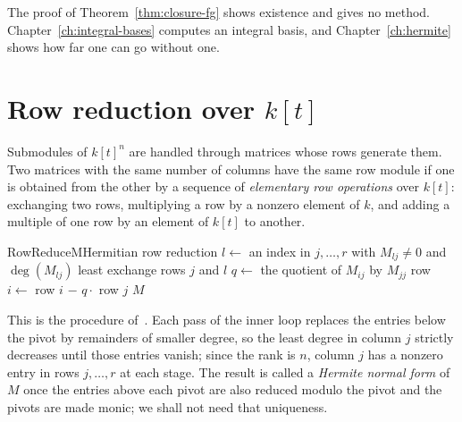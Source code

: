 The proof of Theorem~\ref{thm:closure-fg} shows existence and gives no
method. Chapter~\ref{ch:integral-bases} computes an integral basis, and
Chapter~\ref{ch:hermite} shows how far one can go without one.

\section{Row reduction over \texorpdfstring{$k[t]$}{k[t]}}\label{sec:prelim-hermite}

Submodules of $k[t]^n$ are handled through matrices whose rows generate
them. Two matrices with the same number of columns have the same row module
if one is obtained from the other by a sequence of \emph{elementary row
operations} over $k[t]$: exchanging two rows, multiplying a row by a nonzero
element of $k$, and adding a multiple of one row by an element of $k[t]$ to
another.

\begin{algo}{RowReduce}{M}{Hermitian row reduction}
  \Repeat
    \State $l \gets$ an index in $j, \dots, r$ with $M_{lj} \ne 0$ and $\deg(M_{lj})$ least
    \State exchange rows $j$ and $l$
      \State $q \gets$ the quotient of $M_{ij}$ by $M_{jj}$
      \State row $i \gets$ row $i$ $-$ $q \cdot$ row $j$
    \EndFor
\EndFor
\State \Return $M$
\end{algo}

This is the procedure of~\cite[\S2.1.1]{trager1984}. Each pass of the inner
loop replaces the entries below the pivot by remainders of smaller degree, so
the least degree in column $j$ strictly decreases until those entries vanish;
since the rank is $n$, column $j$ has a nonzero entry in rows $j, \dots, r$
at each stage. The result is called a \emph{Hermite normal form} of $M$ once
the entries above each pivot are also reduced modulo the pivot and the pivots
are made monic; we shall not need that uniqueness.

